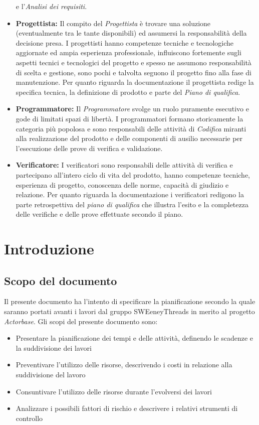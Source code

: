 \documentclass[a4paper]{article}
\begin{document}
\begin{appendices}
\begin{itemize}
				e l'\emph{Analisi dei requisiti}.
				\item \textbf{Progettista:} Il compito del \emph{Progettista} è trovare una soluzione (eventualmente tra le tante disponibili) 
				ed assumersi la responsabilità della decisione presa. I progettisti hanno competenze tecniche e tecnologiche aggiornate 
				ed ampia esperienza professionale, influiscono fortemente sugli aspetti tecnici e tecnologici del progetto e spesso 
				ne assumono responsabilità di scelta e gestione, sono pochi e talvolta seguono il progetto fino alla fase di manutenzione. 
				Per quanto riguarda la documentazione il progettista redige la specifica tecnica, la definizione di prodotto e parte
				 del \emph{Piano di qualifica}.
				\item \textbf{Programmatore:} Il \emph{Programmatore} svolge un ruolo puramente esecutivo e gode di limitati spazi di libertà. 
				I programmatori formano storicamente la categoria più popolosa e sono responsabili delle attività di \emph{Codifica} miranti 
				alla realizzazione del prodotto e delle componenti di ausilio necessarie per l'esecuzione delle prove di verifica e validazione.
				\item \textbf{Verificatore:} I verificatori sono responsabili delle attività di verifica e partecipano all'intero ciclo di vita 
				del prodotto, hanno competenze tecniche, esperienza di progetto, conoscenza delle norme, capacità di giudizio e relazione. Per 
				quanto riguarda la documentazione i verificatori redigono la parte retrospettiva del \emph{piano di qualifica} che illustra l'esito 
				e la completezza delle verifiche e delle prove effettuate secondo il piano.
			\end{itemize}
	\end{appendices}
	
	\newpage 
	\section{Introduzione}
		\subsection{Scopo del documento}
			Il presente documento ha l'intento di specificare la pianificazione secondo la quale saranno portati avanti i 
			lavori dal gruppo SWEeneyThreads in merito al progetto \emph{Actorbase}.
			Gli scopi del presente documento sono:
			\begin{itemize}
				\item Presentare la pianificazione dei tempi e delle attività, definendo le scadenze e la suddivisione dei lavori
				\item Preventivare l'utilizzo delle risorse, descrivendo i costi in relazione alla suddivisione del lavoro
				\item Consuntivare l'utilizzo delle risorse durante l'evolversi dei lavori
				\item Analizzare i possibili fattori di rischio e descrivere i relativi strumenti di controllo
			\end{itemize}
\end{document}
